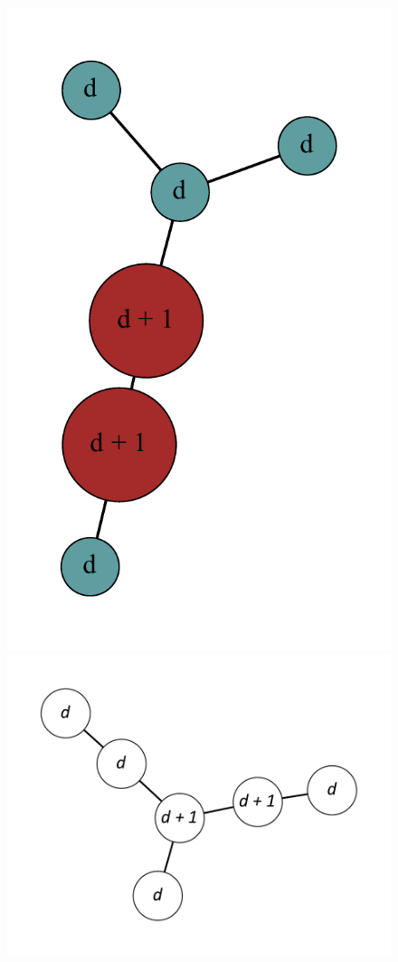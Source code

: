 \documentclass[12pt]{article}
\theoremstyle{plain}
\theoremstyle{definition}
\theoremstyle{remark}
\begin{document}
\begin{figure}[!htb]
\includegraphics[scale=0.25]{Superabundance/MaxDegree3Trees/000110010001010[3,1,1,1,3,3].pdf}
\includegraphics[scale=0.25]{Superabundance/MaxDegree3Trees/001010011001000[2,3,1,1,1,4].pdf}

\end{figure}
\end{document}
